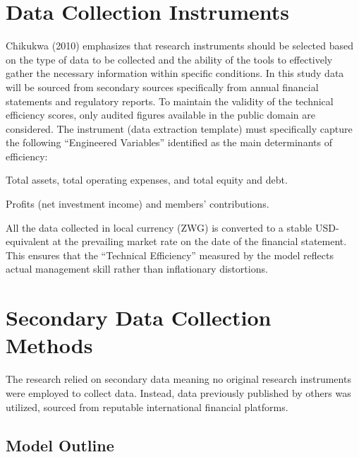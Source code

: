 \documentclass[12pt,a4paper]{article}
\begin{document}
\section{Data Collection Instruments}

Chikukwa (2010) emphasizes that research instruments should be selected based on the type of data to be collected and the ability of the tools to effectively gather the necessary information within specific conditions. In this study data will be sourced from secondary sources specifically from annual financial statements and regulatory reports. To maintain the validity of the technical efficiency scores, only audited figures available in the public domain are considered. The instrument (data extraction template) must specifically capture the following ``Engineered Variables'' identified as the main determinants of efficiency:

\begin{description}[noitemsep]
    \item[Inputs:] Total assets, total operating expenses, and total equity and debt.
    \item[Outputs:] Profits (net investment income) and members' contributions.
\end{description}

All the data collected in local currency (ZWG) is converted to a stable USD-equivalent at the prevailing market rate on the date of the financial statement. This ensures that the ``Technical Efficiency'' measured by the model reflects actual management skill rather than inflationary distortions.

\section{Secondary Data Collection Methods}

The research relied on secondary data meaning no original research instruments were employed to collect data. Instead, data previously published by others was utilized, sourced from reputable international financial platforms.

\subsection{Model Outline}
\end{document}
